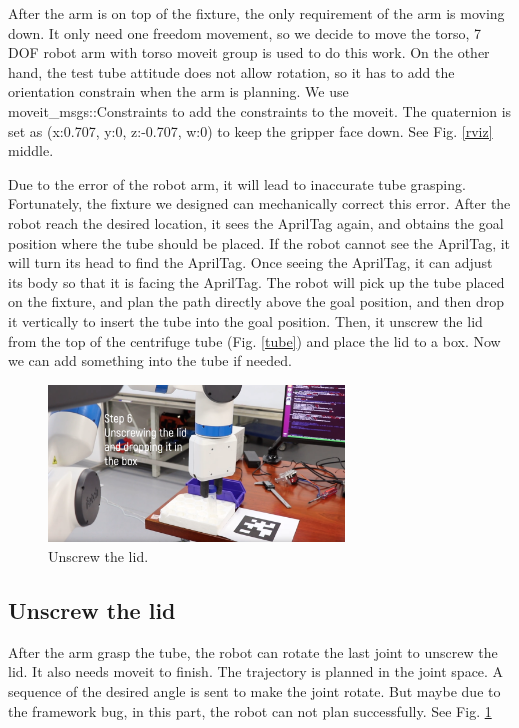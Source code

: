 \documentclass[12pt,draftclsnofoot,onecolumn]{IEEEtran}
\begin{document}
	After the arm is on top of the fixture, the only requirement of the arm is moving down. It only need one freedom movement, so we decide to move the torso, 7 DOF robot arm with torso moveit group is used to do this work. On the other hand, the test tube attitude does not allow rotation, so it has to add the orientation constrain when the arm is planning. We use moveit\_msgs::Constraints to add the constraints to the moveit. The quaternion is set as (x:0.707, y:0, z:-0.707, w:0) to keep the gripper face down. See Fig. \ref{rviz} middle.
	
	Due to the error of the robot arm, it will lead to inaccurate tube grasping. Fortunately, the fixture we designed can mechanically correct this error.
	After the robot reach the desired location, it sees the AprilTag again, and obtains the goal position where the tube should be placed. If the robot cannot see the AprilTag, it will turn its head to find the AprilTag. Once seeing the AprilTag, it can adjust its body so that it is facing the AprilTag.
	The robot will pick up the tube placed on the fixture, and plan the path directly above the goal position, and then drop it vertically to insert the tube into the goal position.
	Then, it unscrew the lid from the top of the centrifuge tube (Fig. \ref{tube}) and place the lid to a box.
	Now we can add something into the tube if needed.
	
	
	\begin{figure}[htbp]  %
		\centering
		\includegraphics[width=0.7\textwidth]{img/screw.png}
		\caption{
			Unscrew the lid.
		}
		\label{screw_lid}
	\end{figure}
	
	\subsection{Unscrew the lid}
	After the arm grasp the tube, the robot can rotate the last joint to unscrew the lid. It also needs moveit to finish. The trajectory is planned in the joint space. A sequence of the desired angle is sent to make the joint rotate. But maybe due to the framework bug, in this part, the robot can not plan successfully. See Fig. \ref{screw_lid}
	
\end{document}
